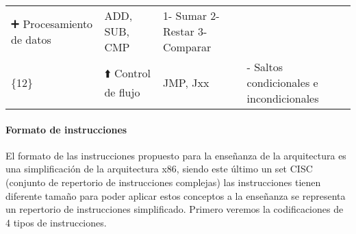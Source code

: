 \documentclass[12pt,twoside]{templates/unerthesis}
\begin{document}
\begin{longtable}[]{@{}llll@{}}
\begin{minipage}[t]{0.16\columnwidth}
➕ Procesamiento de datos\strut
\end{minipage} & \begin{minipage}[t]{0.09\columnwidth}\raggedright
ADD, SUB, CMP\strut
\end{minipage} & \begin{minipage}[t]{0.44\columnwidth}\raggedright
1- Sumar 2- Restar 3- Comparar\strut
\end{minipage}\tabularnewline
\begin{minipage}[t]{0.20\columnwidth}\raggedright
\{12\}\strut
\end{minipage} & \begin{minipage}[t]{0.16\columnwidth}\raggedright
⬆️ Control de flujo\strut
\end{minipage} & \begin{minipage}[t]{0.09\columnwidth}\raggedright
JMP, Jxx\strut
\end{minipage} & \begin{minipage}[t]{0.44\columnwidth}\raggedright
- Saltos condicionales e incondicionales\strut
\end{minipage}\tabularnewline
\bottomrule
\end{longtable}

\hypertarget{formato-de-instrucciones}{%
\paragraph{Formato de instrucciones}\label{formato-de-instrucciones}}

El formato de las instrucciones propuesto para la enseñanza de la arquitectura es una simplificación de la arquitectura x86, siendo este último un set CISC (conjunto de repertorio de instrucciones complejas) las instrucciones tienen diferente tamaño para poder aplicar estos conceptos a la enseñanza se representa un repertorio de instrucciones simplificado.
Primero veremos la codificaciones de 4 tipos de instrucciones.
\end{document}
